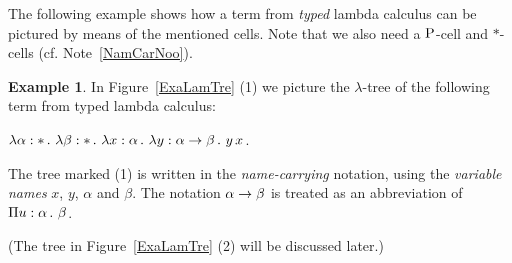 \documentclass{article}
\theoremstyle{plain}
\theoremstyle{definition}
\newtheorem{Exa}[The]{Example}
\begin{document}
The following example shows how a term from {\it typed\/} lambda calculus can be pictured by means of the mentioned cells. Note that we also need a ${\rm P}$-cell and $\ast$-cells (cf. Note~\ref{NamCarNoo}).

\begin{Exa}\label{NamCarExa}
In Figure~\ref{ExaLamTre} (1) we picture the $\lambda$-tree of the following term from typed lambda calculus:

$\lambda \alpha : \ast \, . \,\, \lambda \beta : \ast \, . \,\, \lambda x : \alpha \, . \,\, \lambda y : \alpha \rightarrow \beta \, . \,\, y \, x$.

The tree marked (1) is written in the {\em name-carrying\/} notation, using the {\em variable names\/} $x$, $y$, $\alpha$ and $\beta$. The notation $\alpha \rightarrow \beta$ is treated as an abbreviation of $\Pi u : \alpha \, . \,\, \beta$.

(The tree in Figure~\ref{ExaLamTre} (2) will be discussed later.)

\end{Exa}





\end{document}
